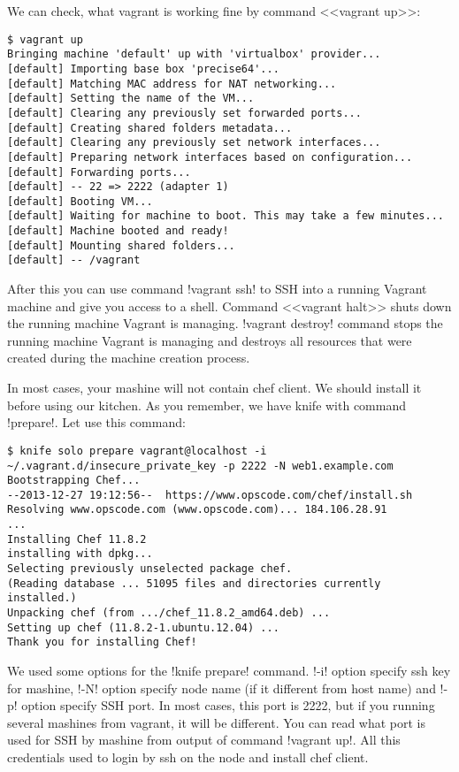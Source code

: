 We can check, what vagrant is working fine by command <<vagrant up>>:

\begin{lstlisting}[label=lst:my-cloud-vagrant4]
$ vagrant up
Bringing machine 'default' up with 'virtualbox' provider...
[default] Importing base box 'precise64'...
[default] Matching MAC address for NAT networking...
[default] Setting the name of the VM...
[default] Clearing any previously set forwarded ports...
[default] Creating shared folders metadata...
[default] Clearing any previously set network interfaces...
[default] Preparing network interfaces based on configuration...
[default] Forwarding ports...
[default] -- 22 => 2222 (adapter 1)
[default] Booting VM...
[default] Waiting for machine to boot. This may take a few minutes...
[default] Machine booted and ready!
[default] Mounting shared folders...
[default] -- /vagrant
\end{lstlisting}

After this you can use command \inline!vagrant ssh! to SSH into a running Vagrant machine and give you access to a shell. Command <<vagrant halt>> shuts down the running machine Vagrant is managing. \inline!vagrant destroy! command stops the running machine Vagrant is managing and destroys all resources that were created during the machine creation process.

In most cases, your mashine will not contain chef client. We should install it before using our kitchen. As you remember, we have knife with command \inline!prepare!. Let use this command:

\begin{lstlisting}[label=lst:my-cloud-vagrant5]
$ knife solo prepare vagrant@localhost -i ~/.vagrant.d/insecure_private_key -p 2222 -N web1.example.com
Bootstrapping Chef...
--2013-12-27 19:12:56--  https://www.opscode.com/chef/install.sh
Resolving www.opscode.com (www.opscode.com)... 184.106.28.91
...
Installing Chef 11.8.2
installing with dpkg...
Selecting previously unselected package chef.
(Reading database ... 51095 files and directories currently installed.)
Unpacking chef (from .../chef_11.8.2_amd64.deb) ...
Setting up chef (11.8.2-1.ubuntu.12.04) ...
Thank you for installing Chef!
\end{lstlisting}

We used some options for the \inline!knife prepare! command. \inline!-i! option specify ssh key for mashine, \inline!-N! option specify node name (if it different from host name) and \inline!-p! option specify SSH port. In most cases, this port is 2222, but if you running several mashines from vagrant, it will be different. You can read what port is used for SSH by mashine from output of command \inline!vagrant up!. All this credentials used to login by ssh on the node and install chef client.

